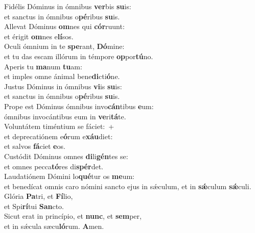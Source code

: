 \evenverse Fidélis Dóminus in ómnibus \textbf{ver}bis \textbf{su}is:~\*\\
\evenverse et sanctus in ómnibus o\textbf{pé}ribus \textbf{su}is.\\
\oddverse Allevat Dóminus \textbf{om}nes qui \textbf{cór}ruunt:~\*\\
\oddverse et érigit \textbf{om}nes e\textbf{lí}sos.\\
\evenverse Oculi ómnium in te \textbf{spe}rant, \textbf{Dó}mine:~\*\\
\evenverse et tu das escam illórum in témpore \textbf{op}por\textbf{tú}no.\\
\oddverse Aperis tu \textbf{ma}num \textbf{tu}am:~\*\\
\oddverse et imples omne ánimal bene\textbf{di}cti\textbf{ó}ne.\\
\evenverse Justus Dóminus in ómnibus \textbf{vi}is \textbf{su}is:~\*\\
\evenverse et sanctus in ómnibus o\textbf{pé}ribus \textbf{su}is.\\
\oddverse Prope est Dóminus ómnibus invo\textbf{cán}tibus \textbf{e}um:~\*\\
\oddverse ómnibus invocántibus eum in \textbf{ve}ri\textbf{tá}te.\\
\evenverse Voluntátem timéntium se fáciet:~+\\
\evenverse  et deprecatiónem e\textbf{ó}rum e\textbf{xáu}diet:~\*\\
\evenverse et salvos \textbf{fá}ciet \textbf{e}os.\\
\oddverse Custódit Dóminus omnes \textbf{di}li\textbf{gén}tes se:~\*\\
\oddverse et omnes pecca\textbf{tó}res di\textbf{spér}det.\\
\evenverse Laudatiónem Dómini lo\textbf{qué}tur os \textbf{me}um:~\*\\
\evenverse et benedícat omnis caro nómini sancto ejus in sǽculum, et in \textbf{sǽ}culum \textbf{sǽ}culi.\\
\oddverse Glória \textbf{Pa}tri, et \textbf{Fí}lio,~\*\\
\oddverse et Spi\textbf{rí}tui \textbf{San}cto.\\
\evenverse Sicut erat in princípio, et \textbf{nunc}, et \textbf{sem}per,~\*\\
\evenverse et in sǽcula sæcu\textbf{ló}rum. \textbf{A}men.\\
